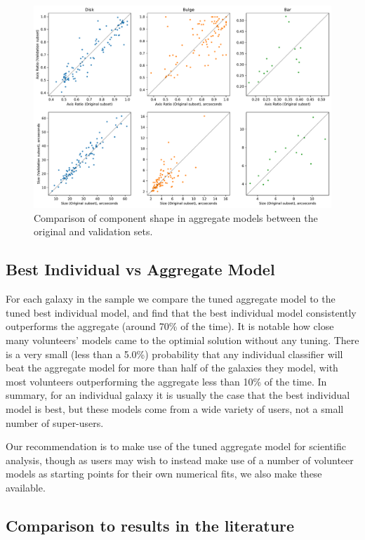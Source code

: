 \documentclass[../main.tex]{subfiles}
\begin{document}
\begin{figure}
  \includegraphics[width=17.3cm]{images__results/component_sizing.pdf}
  \caption{Comparison of component shape in aggregate models between the original and validation sets.}
  \label{fig:aggregate_model_consistency}
\end{figure}

\subsection{Best Individual vs Aggregate Model}

For each galaxy in the sample we compare the tuned aggregate model to the tuned best individual model, and find that the best individual model consistently outperforms the aggregate (around 70\% of the time). It is notable how close many volunteers' models came to the optimial solution without any tuning. There is a very small (less than a 5.0\%) probability that any individual classifier will beat the aggregate model for more than half of the galaxies they model, with most volunteers outperforming the aggregate less than 10\% of the time. In summary, for an individual galaxy it is usually the case that the best individual model is best, but these models come from a wide variety of users, not a small number of super-users.

Our recommendation is to make use of the tuned aggregate model for scientific analysis, though as users may wish to instead make use of a number of volunteer models as starting points for their own numerical fits, we also make these available.


\subsection{Comparison to results in the literature}
\end{document}
